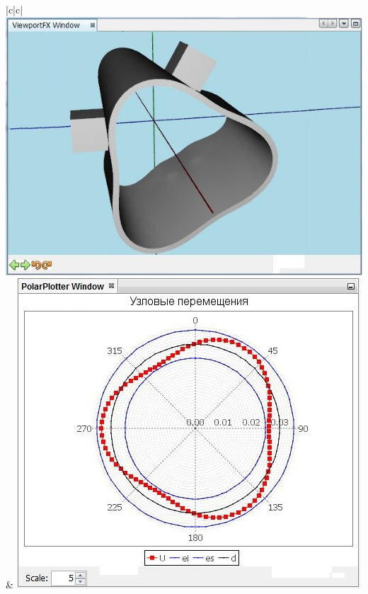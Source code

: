 \documentclass[14pt,oneside,final]{extreport}
\begin{document}
	\begin{table}[]
		\centering
		\caption{Испытание подсистемы моделирования: сила резания}
		\label{tab:modeling-force-tests}{
			{\tabulinesep=1.2mm
				\begin{tabu}[]{|c|c|}
					\hline
					 \\ \hline
					\includegraphics[scale=0.55]{img/simulation-force-test-model1} & \includegraphics[scale=0.55]{img/simulation-force-test-graph1}  \\ 
					\hline
					 \\ \hline

\end{tabu}}}
\end{table}
\end{document}
